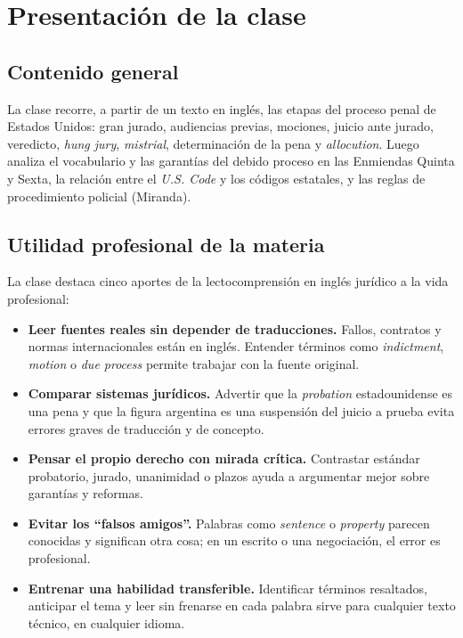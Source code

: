 \documentclass[12pt,oneside]{book}
\begin{document}

\chapter[Presentación de la clase]{Presentación de la clase}

\section{Contenido general}

La clase recorre, a partir de un texto en inglés, las etapas del proceso penal de Estados Unidos: gran jurado, audiencias previas, mociones, juicio ante jurado, veredicto, \textit{hung jury}, \textit{mistrial}, determinación de la pena y \textit{allocution}. Luego analiza el vocabulario y las garantías del debido proceso en las Enmiendas Quinta y Sexta, la relación entre el \textit{U.S. Code} y los códigos estatales, y las reglas de procedimiento policial (Miranda).

\section{Utilidad profesional de la materia}

La clase destaca cinco aportes de la lectocomprensión en inglés jurídico a la vida profesional:

\begin{itemize}
    \item \textbf{Leer fuentes reales sin depender de traducciones.} Fallos, contratos y normas internacionales están en inglés. Entender términos como \textit{indictment}, \textit{motion} o \textit{due process} permite trabajar con la fuente original.
    \item \textbf{Comparar sistemas jurídicos.} Advertir que la \textit{probation} estadounidense es una pena y que la figura argentina es una suspensión del juicio a prueba evita errores graves de traducción y de concepto.
    \item \textbf{Pensar el propio derecho con mirada crítica.} Contrastar estándar probatorio, jurado, unanimidad o plazos ayuda a argumentar mejor sobre garantías y reformas.
    \item \textbf{Evitar los ``falsos amigos''.} Palabras como \textit{sentence} o \textit{property} parecen conocidas y significan otra cosa; en un escrito o una negociación, el error es profesional.
    \item \textbf{Entrenar una habilidad transferible.} Identificar términos resaltados, anticipar el tema y leer sin frenarse en cada palabra sirve para cualquier texto técnico, en cualquier idioma.
\end{itemize}
\end{document}
